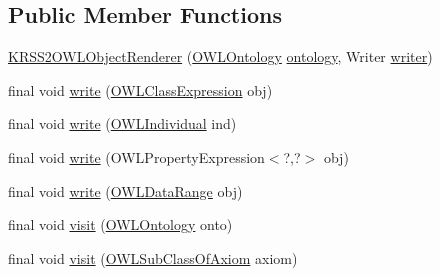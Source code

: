 \subsection*{Public Member Functions}
\begin{DoxyCompactItemize}
\item 
\hyperlink{classde_1_1uulm_1_1ecs_1_1ai_1_1owlapi_1_1krssrenderer_1_1_k_r_s_s2_o_w_l_object_renderer_a6bc9e1d0e4581bb4f8d2cebab7c45e0f}{K\-R\-S\-S2\-O\-W\-L\-Object\-Renderer} (\hyperlink{interfaceorg_1_1semanticweb_1_1owlapi_1_1model_1_1_o_w_l_ontology}{O\-W\-L\-Ontology} \hyperlink{classde_1_1uulm_1_1ecs_1_1ai_1_1owlapi_1_1krssrenderer_1_1_k_r_s_s2_o_w_l_object_renderer_a0e42c03d05c433e1fc5c20517f9ade5a}{ontology}, Writer \hyperlink{classde_1_1uulm_1_1ecs_1_1ai_1_1owlapi_1_1krssrenderer_1_1_k_r_s_s2_o_w_l_object_renderer_ad323dee15e89bfcb425d67a39bf074b9}{writer})
\item 
final void \hyperlink{classde_1_1uulm_1_1ecs_1_1ai_1_1owlapi_1_1krssrenderer_1_1_k_r_s_s2_o_w_l_object_renderer_afffd68685ee5f13acc8c336e1e429e32}{write} (\hyperlink{interfaceorg_1_1semanticweb_1_1owlapi_1_1model_1_1_o_w_l_class_expression}{O\-W\-L\-Class\-Expression} obj)
\item 
final void \hyperlink{classde_1_1uulm_1_1ecs_1_1ai_1_1owlapi_1_1krssrenderer_1_1_k_r_s_s2_o_w_l_object_renderer_ab61d6586797636fbab463359a4faeeb4}{write} (\hyperlink{interfaceorg_1_1semanticweb_1_1owlapi_1_1model_1_1_o_w_l_individual}{O\-W\-L\-Individual} ind)
\item 
final void \hyperlink{classde_1_1uulm_1_1ecs_1_1ai_1_1owlapi_1_1krssrenderer_1_1_k_r_s_s2_o_w_l_object_renderer_ae6418bb3ae8a1df92c2eba5ee515ee20}{write} (O\-W\-L\-Property\-Expression$<$?,?$>$ obj)
\item 
final void \hyperlink{classde_1_1uulm_1_1ecs_1_1ai_1_1owlapi_1_1krssrenderer_1_1_k_r_s_s2_o_w_l_object_renderer_a797ca2c3af4751eacbf54f83db816407}{write} (\hyperlink{interfaceorg_1_1semanticweb_1_1owlapi_1_1model_1_1_o_w_l_data_range}{O\-W\-L\-Data\-Range} obj)
\item 
final void \hyperlink{classde_1_1uulm_1_1ecs_1_1ai_1_1owlapi_1_1krssrenderer_1_1_k_r_s_s2_o_w_l_object_renderer_aff4155d015d8bf26c6d2cd954a31b26e}{visit} (\hyperlink{interfaceorg_1_1semanticweb_1_1owlapi_1_1model_1_1_o_w_l_ontology}{O\-W\-L\-Ontology} onto)
\item 
final void \hyperlink{classde_1_1uulm_1_1ecs_1_1ai_1_1owlapi_1_1krssrenderer_1_1_k_r_s_s2_o_w_l_object_renderer_ab7e72ece8f5fe0bb421925607a8d5e4a}{visit} (\hyperlink{interfaceorg_1_1semanticweb_1_1owlapi_1_1model_1_1_o_w_l_sub_class_of_axiom}{O\-W\-L\-Sub\-Class\-Of\-Axiom} axiom)

\end{DoxyCompactItemize}
